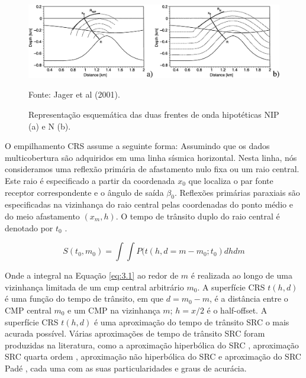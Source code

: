 \begin{figure}[htb]
\caption{Representação esquemática das duas frentes de onda hipotéticas NIP (a) e N (b).}
\begin{center}
\includegraphics[scale=0.13]{images/crr.png}
\vspace{-0.3cm}
\end{center}
\begin{center}
 Fonte: Jager et al (2001).
\end{center}
\label{fig:3.1}
\end{figure}

O empilhamento CRS assume a seguinte forma:
Assumindo que os dados multicobertura são adquiridos em uma linha sísmica horizontal. Nesta linha, nós consideramos
uma reflexão primária de afastamento nulo fixa ou um raio central. Este raio é especificado a partir da coordenada $x_0$
que localiza o par fonte receptor correspondente e o ângulo de saída $\beta_0$. Reflexões primárias 
paraxiais são especificadas na vizinhança do raio central pelas coordenadas do ponto médio e do meio afastamento $(x_m,h)$.
O tempo de trânsito duplo do raio central é denotado por $t_0$ \cite{chirajc}.


\begin{equation}
\label{eq:3.1}
 S(t_0,m_0)=\int\int P(t(h,d=m-m_0;t_0)dhdm
\end{equation}


Onde a integral na Equação \ref{eq:3.1} ao redor de $m$ é realizada ao longo de uma vizinhança limitada de
um cmp central arbitrário $m_0$.
A superfície CRS $t(h,d)$ é uma função do
tempo de trânsito, em que $d=m_0-m$, é a distância entre o CMP central $m_0$ e um CMP na vizinhança $m$;
$h=x/2$ é o half-offset.
A superfície CRS $t(h,d)$ é uma aproximação do tempo de trânsito SRC o mais acurada possível. Várias
aproximações de tempo de trânsito SRC foram produzidas na literatura, como a aproximação hiperbólica do SRC
\cite{jager}, aproximação SRC quarta ordem \cite{germam}, aproximação não hiperbólica do SRC \cite{fomel1}
e aproximação do SRC Padé \cite{neves}, cada uma com as suas particularidades e graus de acurácia.


